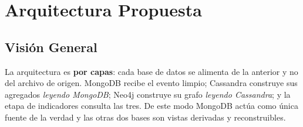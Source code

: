 \section{Arquitectura Propuesta}
\label{sec:arquitectura}

\subsection{Visión General}

La arquitectura es \textbf{por capas}: cada base de datos se alimenta de la anterior y no del archivo de origen. MongoDB recibe el evento limpio; Cassandra construye sus agregados \textit{leyendo MongoDB}; Neo4j construye su grafo \textit{leyendo Cassandra}; y la etapa de indicadores consulta las tres. De este modo MongoDB actúa como única fuente de la verdad y las otras dos bases son vistas derivadas y reconstruibles.


